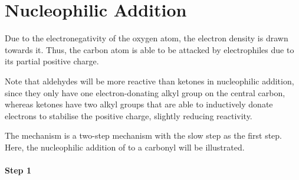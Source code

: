 

































	\pagebreak
	\hypertarget{AppendixNucleophilicAddition}{}
	\section{Nucleophilic Addition}

		Due to the electronegativity of the oxygen atom, the electron density is drawn towards it. Thus, the carbon atom is able
		to be attacked by electrophiles due to its partial positive charge.

		Note that aldehydes will be more reactive than ketones in nucleophilic addition, since they only have one electron-donating
		alkyl group on the central carbon, whereas ketones have two alkyl groups that are able to inductively donate electrons to
		stabilise the positive charge, slightly reducing reactivity.

		The mechanism is a two-step mechanism with the slow step as the first step. Here, the nucleophilic addition of  to
		a carbonyl will be illustrated.

		\paragraph{Step 1}

